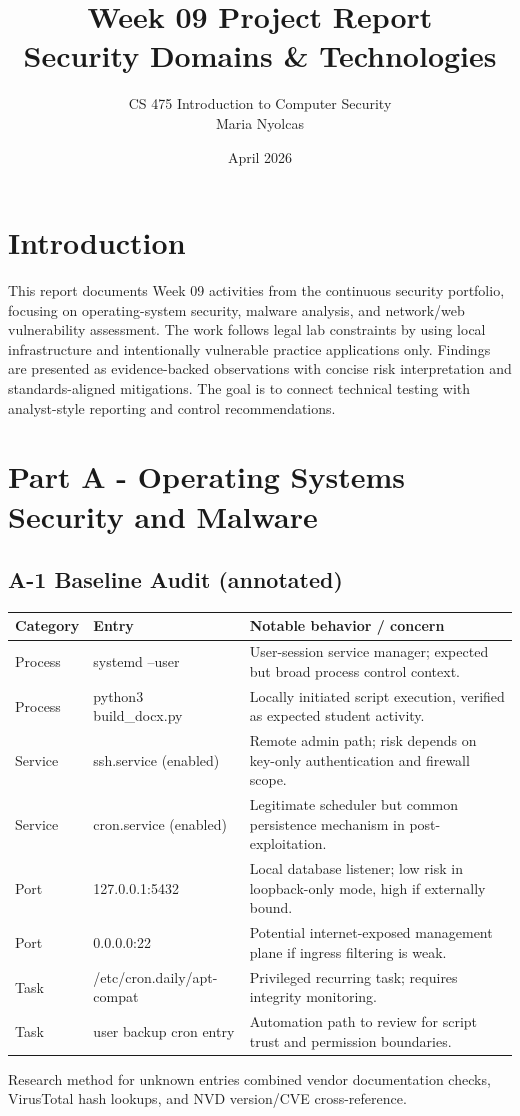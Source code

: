 \documentclass[11pt,a4paper]{article}
\title{Week 09 Project Report \\ Security Domains \& Technologies}
\author{CS 475 Introduction to Computer Security \\ Maria Nyolcas}
\date{April 2026}
\begin{document}
\maketitle

\section*{Introduction}
This report documents Week 09 activities from the continuous security portfolio, focusing on operating-system security, malware analysis, and network/web vulnerability assessment. The work follows legal lab constraints by using local infrastructure and intentionally vulnerable practice applications only. Findings are presented as evidence-backed observations with concise risk interpretation and standards-aligned mitigations. The goal is to connect technical testing with analyst-style reporting and control recommendations.

\section*{Part A - Operating Systems Security and Malware}
\subsection*{A-1 Baseline Audit (annotated)}
\begin{longtable}{p{1.9cm}p{4.2cm}p{7.4cm}}
\toprule
Category & Entry & Notable behavior / concern \\
\midrule
Process & systemd --user & User-session service manager; expected but broad process control context. \\
Process & python3 build\_docx.py & Locally initiated script execution, verified as expected student activity. \\
Service & ssh.service (enabled) & Remote admin path; risk depends on key-only authentication and firewall scope. \\
Service & cron.service (enabled) & Legitimate scheduler but common persistence mechanism in post-exploitation. \\
Port & 127.0.0.1:5432 & Local database listener; low risk in loopback-only mode, high if externally bound. \\
Port & 0.0.0.0:22 & Potential internet-exposed management plane if ingress filtering is weak. \\
Task & /etc/cron.daily/apt-compat & Privileged recurring task; requires integrity monitoring. \\
Task & user backup cron entry & Automation path to review for script trust and permission boundaries. \\
\bottomrule
\end{longtable}
Research method for unknown entries combined vendor documentation checks, VirusTotal hash lookups, and NVD version/CVE cross-reference.
\end{document}
